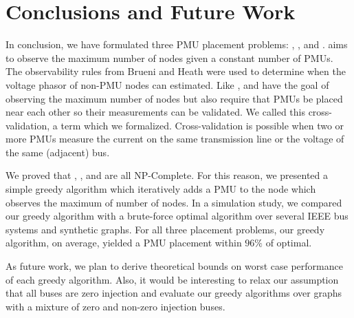 \section{Conclusions and Future Work}
\label{sec:conclude}

In conclusion, we have formulated three PMU placement problems: \maxincs, \xvals, and \xvalparts. \maxinc aims to observe the maximum number of nodes given a constant number of PMUs.
The observability rules from Brueni and Heath \cite{Brueni05} were used to determine when the voltage phasor of non-PMU nodes can estimated.
Like \maxincs, \xval and \xvalpart 
have the goal of observing the maximum number of nodes but also require that PMUs be placed near each other so their measurements can be validated.  We called this 
cross-validation, a term which we formalized. Cross-validation is possible when two or more PMUs measure the current on the same transmission line or the voltage of the same (adjacent) bus.

We proved that \maxincs, \xvals, and \xvalpart are all NP-Complete.  For this reason, we presented a simple greedy algorithm which iteratively adds a PMU to the node which 
observes the maximum of number of nodes.  In a simulation study, we compared our greedy algorithm with a brute-force optimal algorithm over several
IEEE bus systems and synthetic graphs.  For all three placement problems, our greedy algorithm, on average, yielded a PMU placement within $96\%$ of optimal.

As future work, we plan to derive theoretical bounds on worst case performance of each greedy algorithm.
Also, it would be interesting to relax our assumption that all buses are zero injection and evaluate our greedy algorithms over graphs with a 
mixture of zero and non-zero injection buses. 

